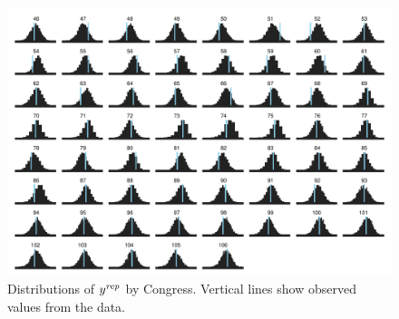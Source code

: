 \vspace{1cm}
\begin{figure}[h]
\centering
	\includegraphics[scale=0.55]{sections/figs/ck_pp_by_cong}
\caption{Distributions of $y^{\it rep}$ by Congress. Vertical lines show observed values from the data.}
\label{fig:ck_pp_nWins_hists}
\end{figure}





